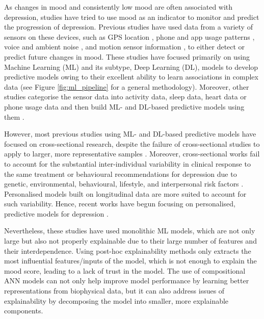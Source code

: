 As changes in mood and consistently low mood are often associated with depression, studies have tried to use mood as an indicator to monitor and predict the progression of depression. Previous studies have used data from a variety of sensors on these devices, such as GPS location \cite{canzian_trajectories_2015, dogrucu_moodable_2020, xu_leveraging_2021}, phone and app usage patterns \cite{chiu_multimodal_2021, nadeem_depression_2022, mastoras_touchscreen_2019}, voice and ambient noise \cite{niu_time-frequency_2021}, and motion sensor information \cite{ghandeharioun_objective_2017}, to either detect or predict future changes in mood. These studies have focused primarily on using Machine Learning (ML) and its subtype, Deep Learning (DL), models to develop predictive models owing to their excellent ability to learn associations in complex data (see Figure \ref{fig:ml_pipeline} for a general methodology). Moreover, other studies categorise the sensor data into activity data, sleep data, heart data or phone usage data and then build ML- and DL-based predictive models using them \cite{choi_depressed_2022, ghandeharioun_objective_2017, nguyen_deep_2021, moshe_predicting_2021, little_deep_2021, thakre_polysomnographic_2022, tazawa_evaluating_2020, coutts_deep_2020}.

However, most previous studies using ML- and DL-based predictive models have focused on cross-sectional research, despite the failure of cross-sectional studies to apply to larger, more representative samples \cite{muller_depression_2021}. Moreover, cross-sectional works fail to account for the substantial inter-individual variability in clinical response to the same treatment or behavioural recommendations for depression due to genetic, environmental, behavioural, lifestyle, and interpersonal risk factors \cite{belmaker_major_2008, drysdale_resting-state_2017}. Personalised models built on longitudinal data are more suited to account for such variability. Hence, recent works have begun focusing on personalised, predictive models for depression \cite{choi_depressed_2022, xu_leveraging_2021, kathan_personalised_2022, jacobson_passive_2020, shah_personalized_2021}. 

Nevertheless, these studies have used monolithic ML models, which are not only large but also not properly explainable due to their large number of features and their interdependence. Using post-hoc explainability methods only extracts the most influential features/inputs of the model, which is not enough to explain the mood score, leading to a lack of trust in the model. The use of compositional ANN models can not only help improve model performance by learning better representations from biophysical data, but it can also address issues of explainability by decomposing the model into smaller, more explainable components.




